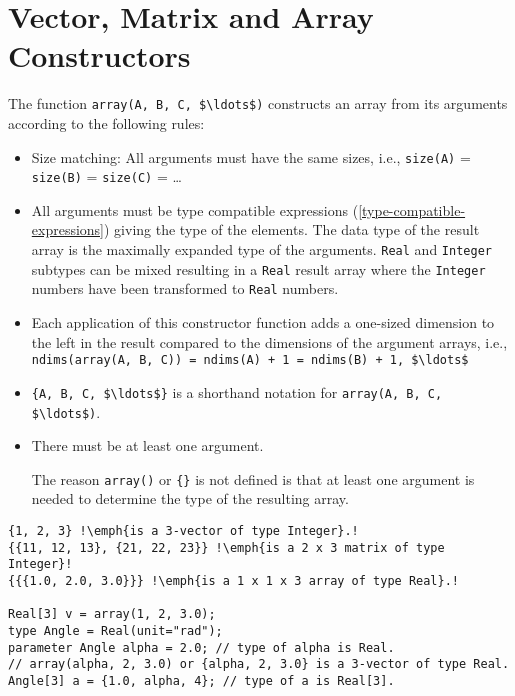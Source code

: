\section{Vector, Matrix and Array Constructors}\label{vector-matrix-and-array-constructors}

The  function \lstinline!array(A, B, C, $\ldots$)! constructs an array from its arguments according to the following rules:
\begin{itemize}
\item
  Size matching: All arguments must have the same sizes, i.e.,
  \lstinline!size(A)! = \lstinline!size(B)! = \lstinline!size(C)! = \ldots
\item
  All arguments must be type compatible expressions (\cref{type-compatible-expressions}) giving the type of the elements.  The data type of the result array is the
  maximally expanded type of the arguments. \lstinline!Real! and \lstinline!Integer! subtypes can be mixed resulting in a \lstinline!Real! result array where the
  \lstinline!Integer! numbers have been transformed to \lstinline!Real! numbers.
\item
  Each application of this constructor function adds a one-sized dimension to the left in the result compared to the dimensions of the argument arrays, i.e.,
  \lstinline!ndims(array(A, B, C)) = ndims(A) + 1 = ndims(B) + 1, $\ldots$!
\item
  \lstinline!{A, B, C, $\ldots$}! is a shorthand notation for \lstinline!array(A, B, C, $\ldots$)!.
\item
  There must be at least one argument.
  \begin{nonnormative}
  The reason \lstinline!array()! or \lstinline!{}! is not defined is that at least one argument is needed to determine the type of the resulting array.
  \end{nonnormative}
\end{itemize}

\begin{example}
\begin{lstlisting}[language=modelica, escapechar=!]
{1, 2, 3} !\emph{is a 3-vector of type Integer}.!
{{11, 12, 13}, {21, 22, 23}} !\emph{is a 2 x 3 matrix of type Integer}!
{{{1.0, 2.0, 3.0}}} !\emph{is a 1 x 1 x 3 array of type Real}.!

Real[3] v = array(1, 2, 3.0);
type Angle = Real(unit="rad");
parameter Angle alpha = 2.0; // type of alpha is Real.
// array(alpha, 2, 3.0) or {alpha, 2, 3.0} is a 3-vector of type Real.
Angle[3] a = {1.0, alpha, 4}; // type of a is Real[3].
\end{lstlisting}
\end{example}

